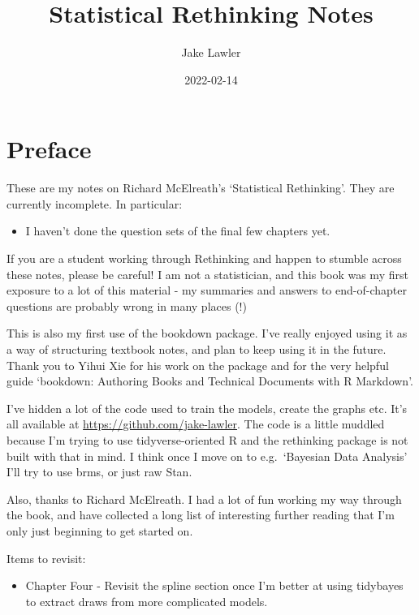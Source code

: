 \documentclass[
]{book}
\title{Statistical Rethinking Notes}
\author{Jake Lawler}
\date{2022-02-14}
\providecommand{\tightlist}{%
  \setlength{\itemsep}{0pt}\setlength{\parskip}{0pt}}
\begin{document}
\maketitle

{
\setcounter{tocdepth}{1}
\tableofcontents
}
\hypertarget{preface}{%
\chapter*{Preface}\label{preface}}

These are my notes on Richard McElreath's `Statistical Rethinking'. They are currently incomplete. In particular:

\begin{itemize}
\tightlist
\item
  I haven't done the question sets of the final few chapters yet.
\end{itemize}

If you are a student working through Rethinking and happen to stumble across these notes, please be careful! I am not a statistician, and this book was my first exposure to a lot of this material - my summaries and answers to end-of-chapter questions are probably wrong in many places (!)

This is also my first use of the bookdown package. I've really enjoyed using it as a way of structuring textbook notes, and plan to keep using it in the future. Thank you to Yihui Xie for his work on the package and for the very helpful guide `bookdown: Authoring Books and Technical Documents with R Markdown'.

I've hidden a lot of the code used to train the models, create the graphs etc. It's all available at \url{https://github.com/jake-lawler}. The code is a little muddled because I'm trying to use tidyverse-oriented R and the rethinking package is not built with that in mind. I think once I move on to e.g.~`Bayesian Data Analysis' I'll try to use brms, or just raw Stan.

Also, thanks to Richard McElreath. I had a lot of fun working my way through the book, and have collected a long list of interesting further reading that I'm only just beginning to get started on.

Items to revisit:

\begin{itemize}
\tightlist
\item
  Chapter Four - Revisit the spline section once I'm better at using tidybayes to extract draws from more complicated models.
\end{itemize}
\end{document}
